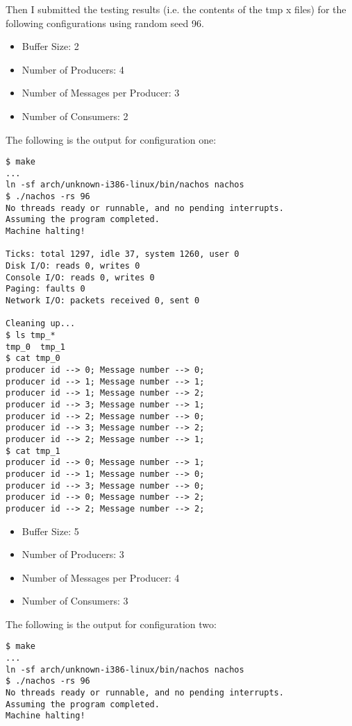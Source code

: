 \documentclass[11pt]{article}
\begin{document}
\begin{question}

    Then I submitted the testing results (i.e. the contents of the tmp x files) for the following configurations using random seed 96.

    \begin{itemize}
        \item{Buffer Size: 2}
        \item{Number of Producers: 4}
        \item{Number of Messages per Producer: 3}
        \item{Number of Consumers: 2}
    \end{itemize}

    The following is the output for configuration one:

    \begin{verbatim}
$ make
...
ln -sf arch/unknown-i386-linux/bin/nachos nachos
$ ./nachos -rs 96
No threads ready or runnable, and no pending interrupts.
Assuming the program completed.
Machine halting!

Ticks: total 1297, idle 37, system 1260, user 0
Disk I/O: reads 0, writes 0
Console I/O: reads 0, writes 0
Paging: faults 0
Network I/O: packets received 0, sent 0

Cleaning up...
$ ls tmp_*
tmp_0  tmp_1
$ cat tmp_0
producer id --> 0; Message number --> 0;
producer id --> 1; Message number --> 1;
producer id --> 1; Message number --> 2;
producer id --> 3; Message number --> 1;
producer id --> 2; Message number --> 0;
producer id --> 3; Message number --> 2;
producer id --> 2; Message number --> 1;
$ cat tmp_1
producer id --> 0; Message number --> 1;
producer id --> 1; Message number --> 0;
producer id --> 3; Message number --> 0;
producer id --> 0; Message number --> 2;
producer id --> 2; Message number --> 2;
    \end{verbatim}

    \begin{itemize}
        \item{Buffer Size: 5}
        \item{Number of Producers: 3}
        \item{Number of Messages per Producer: 4}
        \item{Number of Consumers: 3}
    \end{itemize}

    The following is the output for configuration two:

    \begin{verbatim}
$ make
...
ln -sf arch/unknown-i386-linux/bin/nachos nachos
$ ./nachos -rs 96
No threads ready or runnable, and no pending interrupts.
Assuming the program completed.
Machine halting!


\end{verbatim}
\end{question}
\end{document}
